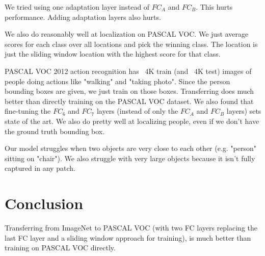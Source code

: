 \documentclass[a4paper]{article}
\begin{document}
We tried using one adaptation layer instead of $FC_A$ and $FC_B$. This hurts
performance. Adding adaptation layers also hurts.

We also do reasonably well at localization on PASCAL VOC. We just average
scores for each class over all locations and pick the winning class. The
location is just the sliding window location with the highest score for that
class.

PASCAL VOC 2012 action recognition has ~4K train (and ~4K test) images
of people doing actions like "walking" and "taking photo". Since the
person bounding boxes are given, we just train on those boxes. Transferring
does much better than directly training on the PASCAL VOC dataset. We also
found that fine-tuning the $FC_6$ and $FC_7$ layers (instead of only the
$FC_A$ and $FC_B$ layers) sets state of the art. We also do pretty well at
localizing people, even if we don't have the ground truth bounding box.

Our model struggles when two objects are very close to each other (e.g.
"person" sitting on "chair"). We also struggle with very large objects because
it isn't fully captured in any patch.

\section{Conclusion}
Transferring from ImageNet to PASCAL VOC (with two FC layers replacing
the last FC layer and a sliding window approach for training), is much
better than training on PASCAL VOC directly.
\end{document}
